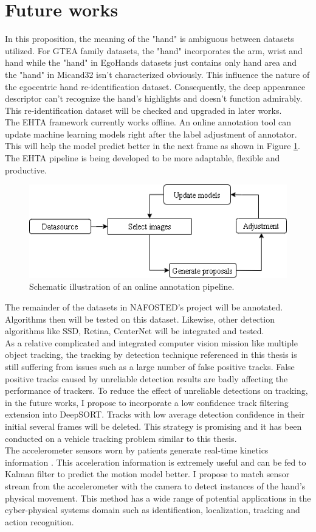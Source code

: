 \section{Future works} \label{sec:futurework}
In this proposition, the meaning of the "hand" is ambiguous between datasets utilized. For GTEA family datasets, the "hand" incorporates the arm, wrist and hand while the "hand" in EgoHands datasets just contains only hand area and the "hand" in Micand32 isn't characterized obviously. This influence the nature of the egocentric hand re-identification dataset. Consequently, the deep appearance descriptor can't recognize the hand's highlights and doesn't function admirably. This re-identification dataset will be checked and upgraded in later works.
\\The EHTA framework currently works offline. An online annotation tool can update machine learning models right after the label adjustment of annotator. This will help the model predict better in the next frame as shown in Figure \ref{fig:future}. The EHTA pipeline is being developed to be more adaptable, flexible and productive. 
\begin{figure}[htbp]
	\centerline{\includegraphics[width=0.5\textheight]{Figs/future.png}}
	\caption{Schematic illustration of an online annotation pipeline.}
	\label{fig:future}
\end{figure}
The remainder of the datasets in NAFOSTED’s project will be annotated. Algorithms then will be tested on this dataset. Likewise, other detection algorithms like SSD, Retina, CenterNet will be integrated and tested.
\\As a relative complicated and integrated computer vision mission like multiple object tracking, the tracking by detection technique referenced in this thesis is still suffering from issues such as a large number of false positive tracks. False positive tracks caused by unreliable detection results are badly affecting the performance of trackers. To reduce the effect of unreliable detections on tracking, in the future works, I propose to incorporate a low confidence track filtering extension into DeepSORT. Tracks with low average detection confidence in their initial several frames will be deleted. This strategy is promising and it has been conducted on a vehicle tracking problem \cite{8909903} similar to this thesis.
\\The accelerometer sensors worn by patients generate real-time kinetics information \cite{4651201}. This acceleration information is extremely useful and can be fed to Kalman filter to predict the motion model better. I propose to match sensor stream from the accelerometer with the camera to detect instances of the hand’s physical movement. This method has a wide range of potential applications in the cyber-physical systems domain such as identification, localization, tracking and action recognition.
